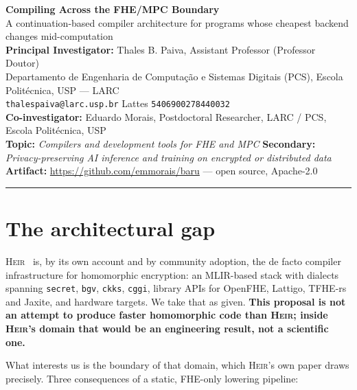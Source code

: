 \documentclass[10pt]{article}
\newcommand{\heir}{\textsc{Heir}}
\begin{document}
\begin{center}
{\Large\bfseries Compiling Across the FHE/MPC Boundary}\\[0.3ex]
{\large A continuation-based compiler architecture for programs whose cheapest backend changes mid-computation}\\[1.0ex]
{\normalsize
\textbf{Principal Investigator:} Thales B. Paiva, Assistant Professor (Professor Doutor)\\
Departamento de Engenharia de Computação e Sistemas Digitais (PCS),
Escola Politécnica, USP --- LARC\\
\texttt{thalespaiva@larc.usp.br} \quad\textbullet\quad
Lattes \texttt{5406900278440032}\\[0.5ex]
\textbf{Co-investigator:} Eduardo Morais, Postdoctoral Researcher, LARC / PCS, Escola Politécnica, USP\\[0.5ex]
\textbf{Topic:} \emph{Compilers and development tools for FHE and MPC}
\quad\textbullet\quad
\textbf{Secondary:} \emph{Privacy-preserving AI inference and training on encrypted or distributed data}\\[0.4ex]
\textbf{Artifact:} \url{https://github.com/emmorais/baru} --- open source, Apache-2.0
}
\end{center}
\vspace{0.3ex}\hrule\vspace{1.0ex}

\section{The architectural gap}

\heir{}~\cite{heir} is, by its own account and by community adoption, the de
facto compiler infrastructure for homomorphic encryption: an MLIR-based stack
with dialects spanning \texttt{secret}, \texttt{bgv}, \texttt{ckks},
\texttt{cggi}, library APIs for OpenFHE, Lattigo, TFHE-rs and Jaxite, and
hardware targets. We take that as given. \textbf{This proposal is not an attempt
to produce faster homomorphic code than \heir{}; inside \heir{}'s domain that
would be an engineering result, not a scientific one.}

What interests us is the boundary of that domain, which \heir{}'s own paper
draws precisely. Three consequences of a static, FHE-only lowering pipeline:
\end{document}
